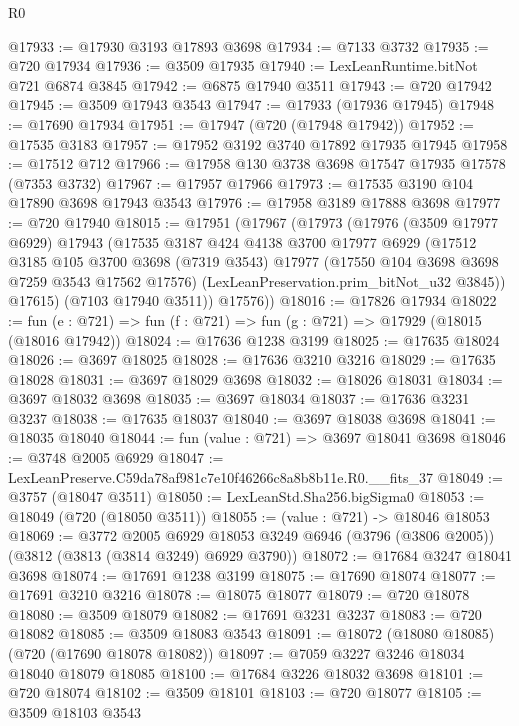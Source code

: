 \begin{lexlean}{R0}
\begin{coremodule}
@17933 := @17930 @3193 @17893 @3698
@17934 := @7133 @3732
@17935 := @720 @17934
@17936 := @3509 @17935
@17940 := LexLeanRuntime.bitNot @721 @6874 @3845
@17942 := @6875 @17940 @3511
@17943 := @720 @17942
@17945 := @3509 @17943 @3543
@17947 := @17933 (@17936 @17945)
@17948 := @17690 @17934
@17951 := @17947 (@720 (@17948 @17942))
@17952 := @17535 @3183
@17957 := @17952 @3192 @3740 @17892 @17935 @17945
@17958 := @17512 @712
@17966 := @17958 @130 @3738 @3698 @17547 @17935 @17578 (@7353 @3732)
@17967 := @17957 @17966
@17973 := @17535 @3190 @104 @17890 @3698 @17943 @3543
@17976 := @17958 @3189 @17888 @3698
@17977 := @720 @17940
@18015 := @17951
    (@17967
      (@17973
        (@17976
          (@3509 @17977 @6929)
          @17943
          (@17535
            @3187
            @424
            @4138
            @3700
            @17977
            @6929
            (@17512
              @3185
              @105
              @3700
              @3698
              (@7319 @3543)
              @17977
              (@17550 @104 @3698 @3698 @7259 @3543 @17562 @17576)
              (LexLeanPreservation.prim_bitNot_u32 @3845))
            @17615)
          (@7103 @17940 @3511))
        @17576))
@18016 := @17826 @17934
@18022 := fun (e : @721) => fun (f : @721) => fun (g : @721) => @17929 (@18015 (@18016 @17942))
@18024 := @17636 @1238 @3199
@18025 := @17635 @18024
@18026 := @3697 @18025
@18028 := @17636 @3210 @3216
@18029 := @17635 @18028
@18031 := @3697 @18029 @3698
@18032 := @18026 @18031
@18034 := @3697 @18032 @3698
@18035 := @3697 @18034
@18037 := @17636 @3231 @3237
@18038 := @17635 @18037
@18040 := @3697 @18038 @3698
@18041 := @18035 @18040
@18044 := fun (value : @721) => @3697 @18041 @3698
@18046 := @3748 @2005 @6929
@18047 := LexLeanPreserve.C59da78af981c7e10f46266c8a8b8b11e.R0.__fits_37
@18049 := @3757 (@18047 @3511)
@18050 := LexLeanStd.Sha256.bigSigma0
@18053 := @18049 (@720 (@18050 @3511))
@18055 := (value : @721) -> @18046 @18053
@18069 := @3772
    @2005
    @6929
    @18053
    @3249
    @6946
    (@3796 (@3806 @2005))
    (@3812 (@3813 (@3814 @3249) @6929 @3790))
@18072 := @17684 @3247 @18041 @3698
@18074 := @17691 @1238 @3199
@18075 := @17690 @18074
@18077 := @17691 @3210 @3216
@18078 := @18075 @18077
@18079 := @720 @18078
@18080 := @3509 @18079
@18082 := @17691 @3231 @3237
@18083 := @720 @18082
@18085 := @3509 @18083 @3543
@18091 := @18072 (@18080 @18085) (@720 (@17690 @18078 @18082))
@18097 := @7059 @3227 @3246 @18034 @18040 @18079 @18085
@18100 := @17684 @3226 @18032 @3698
@18101 := @720 @18074
@18102 := @3509 @18101
@18103 := @720 @18077
@18105 := @3509 @18103 @3543

\end{coremodule}
\end{lexlean}
